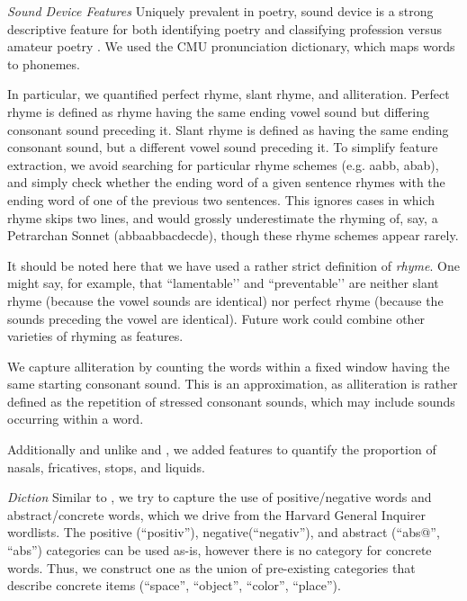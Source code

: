 \documentclass[11pt]{article}
\begin{document}
\emph{Sound Device Features}
Uniquely prevalent in poetry, sound device is a strong descriptive feature for both identifying poetry \cite{tizhoosh2008poetic} and classifying profession versus amateur poetry \cite{kao2012computational}. We used the CMU pronunciation dictionary, which maps words to phonemes.

In particular, we quantified perfect rhyme, slant rhyme, and alliteration. Perfect rhyme is defined as rhyme having the same ending vowel sound but differing consonant sound preceding it. Slant rhyme is defined as having the same ending consonant sound, but a different vowel sound preceding it. To simplify feature extraction, we avoid searching for particular rhyme schemes (e.g. aabb, abab), and simply check whether the ending word of a given sentence rhymes with the ending word of one of the previous two sentences. This ignores cases in which rhyme skips two lines, and would grossly underestimate the rhyming of, say, a Petrarchan Sonnet (abbaabbacdecde), though these rhyme schemes appear rarely.

It should be noted here that we have used a rather strict definition of \emph{rhyme}. One might say, for example, that ``lamentable’’ and ``preventable’’ are neither slant rhyme (because the vowel sounds are identical) nor perfect rhyme (because the sounds preceding the vowel are identical). Future work could combine other varieties of rhyming as features.

We capture alliteration by counting the words within a fixed window having the same starting consonant sound. This is an approximation, as alliteration is rather defined as the repetition of stressed consonant sounds, which may include sounds occurring within a word.

Additionally and unlike  and , we added features to quantify the proportion of nasals, fricatives, stops, and liquids. 

\emph{Diction}
Similar to \cite{kao2012computational}, we try to capture the use of positive/negative words and abstract/concrete words, which we drive from the Harvard General Inquirer wordlists. The positive (``positiv''), negative(``negativ''), and abstract (``abs@'', ``abs'') categories can be used as-is, however there is no category for concrete words. Thus, we construct one as the union of pre-existing categories that describe concrete items (``space'', ``object'', ``color'', ``place'').
\end{document}
